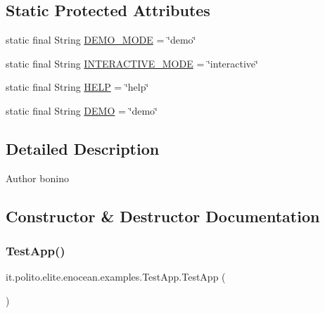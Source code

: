 \subsection*{Static Protected Attributes}
\begin{DoxyCompactItemize}
\item 
static final String \hyperlink{classit_1_1polito_1_1elite_1_1enocean_1_1examples_1_1_test_app_ad411768c618cfc3582dd58c03c6fb41a}{D\+E\+M\+O\+\_\+\+M\+O\+DE} = \char`\"{}demo\char`\"{}
\item 
static final String \hyperlink{classit_1_1polito_1_1elite_1_1enocean_1_1examples_1_1_test_app_a808967bb916dda08b2e63f109cbc75ea}{I\+N\+T\+E\+R\+A\+C\+T\+I\+V\+E\+\_\+\+M\+O\+DE} = \char`\"{}interactive\char`\"{}
\item 
static final String \hyperlink{classit_1_1polito_1_1elite_1_1enocean_1_1examples_1_1_test_app_a59ffff9f6d820613d40212515113bf4b}{H\+E\+LP} = \char`\"{}help\char`\"{}
\item 
static final String \hyperlink{classit_1_1polito_1_1elite_1_1enocean_1_1examples_1_1_test_app_a1315ab9f70d935035ff5d345da90b155}{D\+E\+MO} = \char`\"{}demo\char`\"{}
\end{DoxyCompactItemize}


\subsection{Detailed Description}
\begin{DoxyAuthor}{Author}
bonino 
\end{DoxyAuthor}


\subsection{Constructor \& Destructor Documentation}
\hypertarget{classit_1_1polito_1_1elite_1_1enocean_1_1examples_1_1_test_app_a19dbea1142071b0aefadf45ec2ae1ff6}{}\label{classit_1_1polito_1_1elite_1_1enocean_1_1examples_1_1_test_app_a19dbea1142071b0aefadf45ec2ae1ff6} 
\subsubsection{\texorpdfstring{Test\+App()}{TestApp()}}
{\footnotesize\ttfamily it.\+polito.\+elite.\+enocean.\+examples.\+Test\+App.\+Test\+App (\begin{DoxyParamCaption}{ }\end{DoxyParamCaption})}



